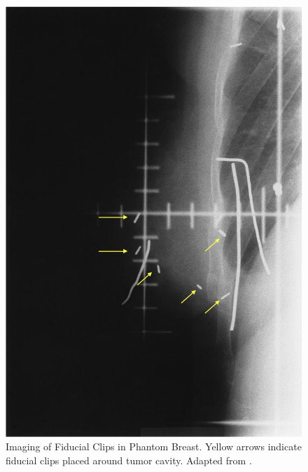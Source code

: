 \begin{figure}[H]
        \centering
        \includegraphics[height=0.3\textheight]{../figs/literature_review/imaging_of_fiducal_clips_in_phantom_breast.png}
        \caption{Imaging of Fiducial Clips in Phantom Breast. Yellow arrows indicate fiducial clips placed around tumor cavity. Adapted from \cite{RefWorks:RefID:178-krawczyk1994importance}.}
        \label{fig:literatureReview:imaging_of_fiducal_clips_in_phantom_breast}
\end{figure}

